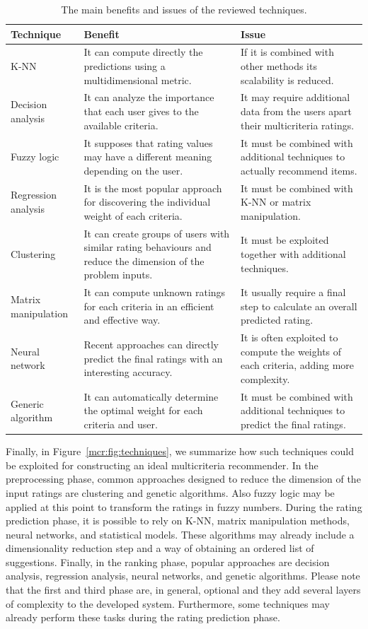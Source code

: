 \begin{table}
\begin{tabularx}{\linewidth}{lXX}
\toprule
Technique & Benefit & Issue \\ \midrule
K-NN & It can compute directly the predictions using a multidimensional metric. & If it is combined with other methods its scalability is reduced. \\
Decision analysis & It can analyze the importance that each user gives to the available criteria. & It may require additional data from the users apart their multicriteria ratings. \\
Fuzzy logic & It supposes that rating values may have a different meaning depending on the user. & It must be combined with additional techniques to actually recommend items. \\
Regression analysis & It is the most popular approach for discovering the individual weight of each criteria. & It must be combined with K-NN or matrix manipulation. \\
Clustering & It can create groups of users with similar rating behaviours and reduce the dimension of the problem inputs. & It must be exploited together with additional techniques. \\
Matrix manipulation & It can compute unknown ratings for each criteria in an efficient and effective way. & It usually require a final step to calculate an overall predicted rating. \\
Neural network & Recent approaches can directly predict the final ratings with an interesting accuracy. & It is often exploited to compute the weights of each criteria, adding more complexity. \\
Generic algorithm & It can automatically determine the optimal weight for each criteria and user. & It must be combined with additional techniques to predict the final ratings. \\ \bottomrule
\end{tabularx}
\caption[Benefits and issues of the techniques]{The main benefits and issues of the reviewed techniques.}
\label{mcr:tab:comparison}
\end{table}

Finally, in Figure~\ref{mcr:fig:techniques}, we summarize how such techniques could be exploited for constructing an ideal multicriteria recommender. In the preprocessing phase, common approaches designed to reduce the dimension of the input ratings are clustering and genetic algorithms. Also fuzzy logic may be applied at this point to transform the ratings in fuzzy numbers. During the rating prediction phase, it is possible to rely on K-NN, matrix manipulation methods, neural networks, and statistical models. These algorithms may already include a dimensionality reduction step and a way of obtaining an ordered list of suggestions. Finally, in the ranking phase, popular approaches are decision analysis, regression analysis, neural networks, and genetic algorithms. Please note that the first and third phase are, in general, optional and they add several layers of complexity to the developed system. Furthermore, some techniques may already perform these tasks during the rating prediction phase.

